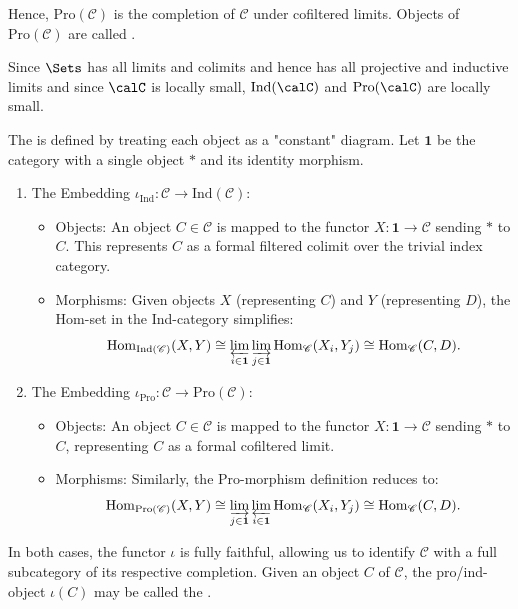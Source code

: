 \begin{definition}
\begin{enumerate}
    Hence, \(\mathrm{Pro}(\mathcal{C})\) is the completion of \(\mathcal{C}\) under cofiltered limits. Objects of $\mathrm{Pro}(\mathcal{C})$ are called .


\end{enumerate}

    Since $\Sets$ has all limits and colimits \TODO{} and hence has all projective and inductive limits and since $\calC$ is locally small, $\mathrm{Ind}(\calC)$ and $\mathrm{Pro}(\calC)$ are locally small.


    The  is defined by treating each object as a "constant" diagram. Let $\mathbf{1}$ be the category with a single object $*$ and its identity morphism.

    \begin{enumerate}
    \item  The Embedding $\iota_{\mathrm{Ind}}: \mathscr{C} \to \mathrm{Ind}(\mathscr{C})$:
    \begin{itemize}
        \item Objects: An object $C \in \mathscr{C}$ is mapped to the functor $X: \mathbf{1} \to \mathscr{C}$ sending $*$ to $C$. This represents $C$ as a formal filtered colimit over the trivial index category.
        \item Morphisms: Given objects $X$ (representing $C$) and $Y$ (representing $D$), the Hom-set in the Ind-category simplifies:
            $$ \mathrm{Hom}_{\mathrm{Ind}(\mathscr{C})}(X, Y) \cong \varprojlim_{i \in \mathbf{1}} \varinjlim_{j \in \mathbf{1}} \mathrm{Hom}_{\mathscr{C}}(X_i, Y_j) \cong \mathrm{Hom}_{\mathscr{C}}(C, D). $$
    \end{itemize}

    \item  The Embedding $\iota_{\mathrm{Pro}}: \mathscr{C} \to \mathrm{Pro}(\mathscr{C})$:
    \begin{itemize}
        \item Objects: An object $C \in \mathscr{C}$ is mapped to the functor $X: \mathbf{1} \to \mathscr{C}$ sending $*$ to $C$, representing $C$ as a formal cofiltered limit.
        \item Morphisms: Similarly, the Pro-morphism definition reduces to:
            $$ \mathrm{Hom}_{\mathrm{Pro}(\mathscr{C})}(X, Y) \cong \varinjlim_{j \in \mathbf{1}} \varprojlim_{i \in \mathbf{1}} \mathrm{Hom}_{\mathscr{C}}(X_i, Y_j) \cong \mathrm{Hom}_{\mathscr{C}}(C, D). $$
    \end{itemize}
    \end{enumerate}
    In both cases, the functor $\iota$ is fully faithful, allowing us to identify $\mathscr{C}$ with a full subcategory of its respective completion. Given an object $C$ of $\mathscr{C}$, the pro/ind-object $\iota(C)$ may be called the .

\end{definition}
